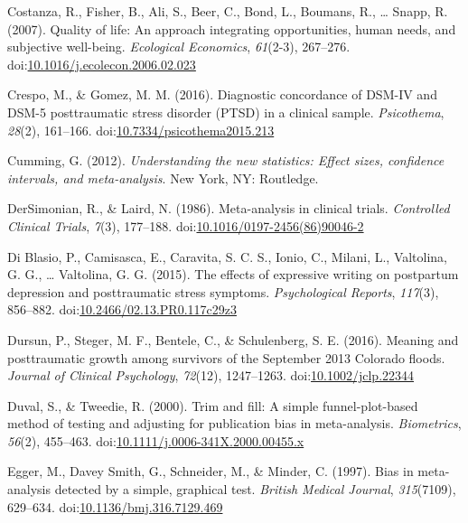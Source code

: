 \documentclass[english,man, mask]{apa6}
\theoremstyle{definition}
\theoremstyle{definition}
\theoremstyle{definition}
\theoremstyle{remark}
\begin{document}
\hypertarget{ref-Costanza2007}{}
Costanza, R., Fisher, B., Ali, S., Beer, C., Bond, L., Boumans, R.,
\ldots{} Snapp, R. (2007). Quality of life: An approach integrating
opportunities, human needs, and subjective well-being. \emph{Ecological
Economics}, \emph{61}(2-3), 267--276.
doi:\href{https://doi.org/10.1016/j.ecolecon.2006.02.023}{10.1016/j.ecolecon.2006.02.023}

\hypertarget{ref-Crespo2016}{}
Crespo, M., \& Gomez, M. M. (2016). Diagnostic concordance of DSM-IV and
DSM-5 posttraumatic stress disorder (PTSD) in a clinical sample.
\emph{Psicothema}, \emph{28}(2), 161--166.
doi:\href{https://doi.org/10.7334/psicothema2015.213}{10.7334/psicothema2015.213}

\hypertarget{ref-Cumming2012}{}
Cumming, G. (2012). \emph{Understanding the new statistics: Effect
sizes, confidence intervals, and meta-analysis}. New York, NY:
Routledge.

\hypertarget{ref-DerSimonian1986}{}
DerSimonian, R., \& Laird, N. (1986). Meta-analysis in clinical trials.
\emph{Controlled Clinical Trials}, \emph{7}(3), 177--188.
doi:\href{https://doi.org/10.1016/0197-2456(86)90046-2}{10.1016/0197-2456(86)90046-2}

\hypertarget{ref-Blasio2015a}{}
Di Blasio, P., Camisasca, E., Caravita, S. C. S., Ionio, C., Milani, L.,
Valtolina, G. G., \ldots{} Valtolina, G. G. (2015). The effects of
expressive writing on postpartum depression and posttraumatic stress
symptoms. \emph{Psychological Reports}, \emph{117}(3), 856--882.
doi:\href{https://doi.org/10.2466/02.13.PR0.117c29z3}{10.2466/02.13.PR0.117c29z3}

\hypertarget{ref-Dursun2016}{}
Dursun, P., Steger, M. F., Bentele, C., \& Schulenberg, S. E. (2016).
Meaning and posttraumatic growth among survivors of the September 2013
Colorado floods. \emph{Journal of Clinical Psychology}, \emph{72}(12),
1247--1263.
doi:\href{https://doi.org/10.1002/jclp.22344}{10.1002/jclp.22344}

\hypertarget{ref-Duval2000}{}
Duval, S., \& Tweedie, R. (2000). Trim and fill: A simple
funnel-plot-based method of testing and adjusting for publication bias
in meta-analysis. \emph{Biometrics}, \emph{56}(2), 455--463.
doi:\href{https://doi.org/10.1111/j.0006-341X.2000.00455.x}{10.1111/j.0006-341X.2000.00455.x}

\hypertarget{ref-Egger1997}{}
Egger, M., Davey Smith, G., Schneider, M., \& Minder, C. (1997). Bias in
meta-analysis detected by a simple, graphical test. \emph{British
Medical Journal}, \emph{315}(7109), 629--634.
doi:\href{https://doi.org/10.1136/bmj.316.7129.469}{10.1136/bmj.316.7129.469}
\end{document}
